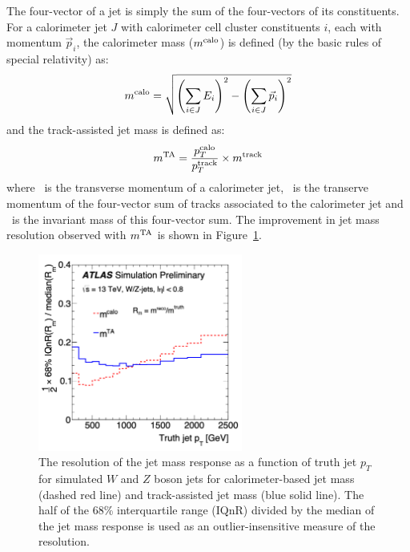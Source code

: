 The four-vector of a jet is simply the sum of the four-vectors of its constituents. For a calorimeter jet $J$ with calorimeter cell cluster constituents $i$, each with momentum $\vec{p}_i$, the calorimeter mass ($m^{\mathrm{calo}}$) is defined (by the basic rules of special relativity) as:
\begin{equation}
    m^{\mathrm{calo}} = \sqrt{
        \left(
            \sum_{i \in J} E_i
        \right)^2
            -
        \left(
            \sum_{i \in J} \vec{p}_i
        \right)^2
    }
    \label{eqn:ta_jet_mass}
\end{equation}
and the track-assisted jet mass is defined as:
\begin{equation}
    m^{\mathrm{TA}} = \frac{p_T^{\mathrm{calo}}}{p_T^{\mathrm{track}}} \times m^{\mathrm{track}}
    \label{eqn:ta_jet_mass}
\end{equation}
where \ptCALO\ is the transverse momentum of a calorimeter jet, \ptTRACK\ is the transerve momentum of the four-vector sum of tracks associated to the calorimeter jet and \mTRACK\ is the invariant mass of this four-vector sum.
The improvement in jet mass resolution observed with $m^{\mathrm{TA}}$ is shown in Figure~\ref{fig:ta_vs_comb_mass_res}.

\begin{figure}
	\centering
	\includegraphics[width=0.6\textwidth]{ta_vs_calo_mass_res_wz_jets}
	\caption{
	The resolution of the jet mass response as a function of truth jet $p_T$ for simulated $W$ and $Z$ boson jets for calorimeter-based jet mass (dashed red line) and track-assisted jet mass (blue solid line).
	The half of the 68\% interquartile range (IQnR) divided by the median of the jet mass response is used as an outlier-insensitive measure of the resolution.
	\cite{ATLAS-CONF-2016-035}
	}
	\label{fig:ta_vs_comb_mass_res}
\end{figure}

